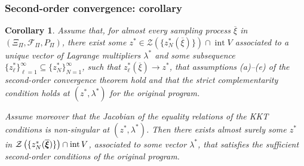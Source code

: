 \documentclass[aspectratio=169]{beamer}
\newtheorem{coro}{Corollary}
\begin{document}
\begin{frame}
\frametitle{Second-order convergence: corollary}

\begin{coro}
Assume that, for almost every sampling process $\overline{\xi}$ in $(\Xi_{\Pi}, \mathcal{F}_{\Pi}, P_{\Pi})$, there exist some $z^* \in \mathcal{Z} \left(\lbrace z^*_N(\overline{\xi})\rbrace\right) \cap \operatorname{int} V$ associated to a unique vector of Lagrange multipliers $\lambda^*$ and some subsequence $\lbrace z_{\ell}^* \rbrace_{\ell = 1}^{\infty} \subseteq \lbrace  z_N^* \rbrace_{N = 1}^{\infty}$, such that $z^*_{\ell}(\overline{\xi}) \rightarrow z^*$, that assumptions (a)--(e) of the second-order convergence theorem hold and that the strict complementarity condition holds at $( z^*, \lambda^* )$ for the original program.

\mbox{}

Assume moreover that the Jacobian of the equality relations of the KKT conditions is non-singular at $( z^*, \lambda^* )$.
Then there exists almost surely some $z^*$ in $\mathcal{Z} \left( \lbrace z_N^*(\overline{{\boldsymbol{\xi}}}) \rbrace \right) \cap \operatorname{int} V$, associated to some vector $\lambda^*$, that satisfies the sufficient second-order conditions of the original program.
\end{coro}

\end{frame}





\end{document}
